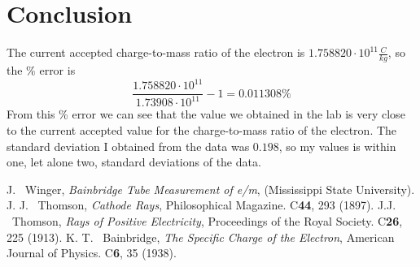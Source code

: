 \documentclass[aps,prl,10pt,twocolumn,floatfix]{revtex4-2}
\begin{document}
\section{Conclusion}
The current accepted charge-to-mass ratio of the electron is $1.758820\cdot10^{11}\frac{C}{kg}$, so the \% error is
\begin{equation}
	\frac{1.758820\cdot10^{11}}{1.73908\cdot10^{11}} -1=0.011308\%
\end{equation}
From this \% error we can see that the value we obtained in the lab is very close to the current accepted value for the charge-to-mass ratio of the electron. 
The standard deviation I obtained from the data was $0.198$, so my values is within one, let alone two, standard deviations of the data. 

\begin{thebibliography}{9}
 J. ~Winger, \textit{Bainbridge Tube Measurement of e/m}, (Mississippi State University).
 J. J. ~Thomson, \textit{Cathode Rays}, Philosophical Magazine. C\textbf{44}, 293 (1897).
 J.J. ~Thomson, \textit{Rays of Positive Electricity}, Proceedings of the Royal Society. C\textbf{26}, 225 (1913).
 K. T. ~Bainbridge, \textit{The Specific Charge of the Electron}, American Journal of Physics. C\textbf{6}, 35 (1938).
\end{thebibliography}
\end{document}
